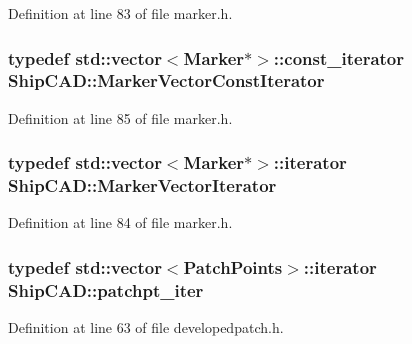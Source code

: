 Definition at line 83 of file marker.\+h.

\subsubsection[{\texorpdfstring{Marker\+Vector\+Const\+Iterator}{MarkerVectorConstIterator}}]{\setlength{\rightskip}{0pt plus 5cm}typedef std\+::vector$<${\bf Marker}$\ast$$>$\+::const\+\_\+iterator {\bf Ship\+C\+A\+D\+::\+Marker\+Vector\+Const\+Iterator}}\hypertarget{namespaceShipCAD_a6da02a910d5a7dac854646964af42933}{}\label{namespaceShipCAD_a6da02a910d5a7dac854646964af42933}


Definition at line 85 of file marker.\+h.

\subsubsection[{\texorpdfstring{Marker\+Vector\+Iterator}{MarkerVectorIterator}}]{\setlength{\rightskip}{0pt plus 5cm}typedef std\+::vector$<${\bf Marker}$\ast$$>$\+::iterator {\bf Ship\+C\+A\+D\+::\+Marker\+Vector\+Iterator}}\hypertarget{namespaceShipCAD_a880f36455b3b35823ae14bdd62e20b31}{}\label{namespaceShipCAD_a880f36455b3b35823ae14bdd62e20b31}


Definition at line 84 of file marker.\+h.

\subsubsection[{\texorpdfstring{patchpt\+\_\+iter}{patchpt_iter}}]{\setlength{\rightskip}{0pt plus 5cm}typedef std\+::vector$<${\bf Patch\+Points}$>$\+::iterator {\bf Ship\+C\+A\+D\+::patchpt\+\_\+iter}}\hypertarget{namespaceShipCAD_a69b081dd347722fb55da2f3958db5d08}{}\label{namespaceShipCAD_a69b081dd347722fb55da2f3958db5d08}


Definition at line 63 of file developedpatch.\+h.

